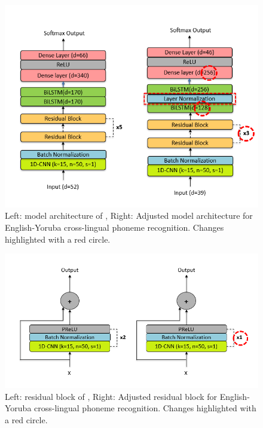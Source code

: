 \documentclass[11pt]{article}
\begin{document}
{\begin{figure}
    \centering
    \includegraphics[width=1\linewidth]{modelarchitecture+.png}
    \caption{Left: model architecture of \cite{dhakal2022automatic} , Right: Adjusted model architecture for English-Yoruba cross-lingual phoneme recognition. Changes highlighted with a red circle.}
    \label{fig:architecture}
\end{figure}


\begin{figure}
    \centering
    \includegraphics[width=1\linewidth]{residualblock.PNG}
    \caption{Left: residual block of \cite{dhakal2022automatic}, Right: Adjusted residual block for English-Yoruba cross-lingual phoneme recognition. Changes highlighted with a red circle.}
    \label{fig:residualblock}
\end{figure}

}
\end{document}

